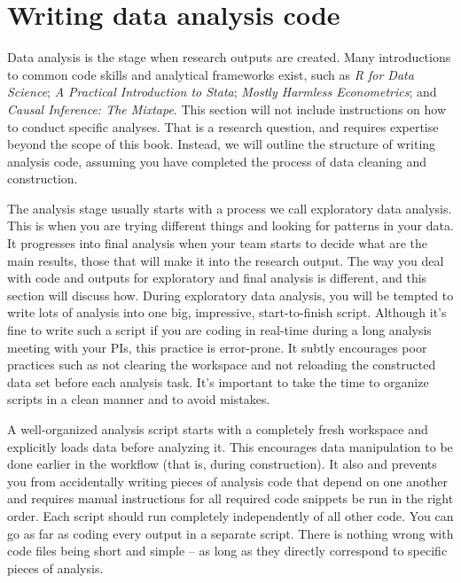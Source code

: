 
\section{Writing data analysis code}

Data analysis is the stage when research outputs are created. 
Many introductions to common code skills and analytical frameworks exist, such as
\textit{R for Data Science};
\textit{A Practical Introduction to Stata};
\textit{Mostly Harmless Econometrics}; 
and \textit{Causal Inference: The Mixtape}.
This section will not include instructions on how to conduct specific analyses.
That is a research question, and requires expertise beyond the scope of this book.
Instead, we will outline the structure of writing analysis code,
assuming you have completed the process of data cleaning and construction.

The analysis stage usually starts with a process we call exploratory data analysis.
This is when you are trying different things and looking for patterns in your data. 
It progresses into final analysis when your team starts to decide what are the main results, those that will make it into the research output.
The way you deal with code and outputs for exploratory and final analysis is different, and this section will discuss how.
During exploratory data analysis, you will be tempted to write lots of analysis into one big, impressive, start-to-finish script. 
Although it's fine to write such a script if you are coding in real-time during a long analysis meeting with your PIs, this practice is error-prone.  
It subtly encourages poor practices such as not clearing the workspace and not reloading the constructed data set before each analysis task. 
It's important to take the time to organize scripts in a clean manner and to avoid mistakes.

A well-organized analysis script starts with a completely fresh workspace and explicitly loads data before analyzing it.
This encourages data manipulation to be done earlier in the workflow (that is, during construction).
It also and prevents you from accidentally writing pieces of analysis code that depend on one another and requires manual instructions for all required code snippets be run in the right order.
Each script should run completely independently of all other code.
You can go as far as coding every output in a separate script.
There is nothing wrong with code files being short and simple -- as long as they directly correspond to specific pieces of analysis.

